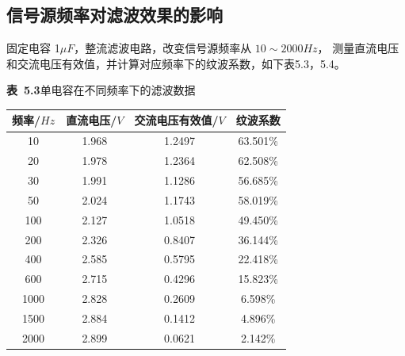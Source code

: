\documentclass{article}
\def\kong{\hspace*{2em}}
\begin{document}
    \subsection{信号源频率对滤波效果的影响}
        \kong 固定电容 1$\mu F$，整流滤波电路，改变信号源频率从 $10\sim2000Hz$，
        测量直流电压和交流电压有效值，并计算对应频率下的纹波系数，如下表5.3，5.4。\\[14pt]
        \begin{minipage}{1\linewidth}
            \centering
            \textbf{表\ 5.3}\quad 单电容在不同频率下的滤波数据  \\[4pt]
            \begin{tabular}{|c|c|c|c|}
            \hline
                    频率/$Hz$        & 直流电压/$V$   & 交流电压有效值/$V$  & 纹波系数  \\ \hline
                    10   & 1.968 & 1.2497 & 63.501\% \\ \hline
                    20   & 1.978 & 1.2364 & 62.508\% \\ \hline
                    30   & 1.991 & 1.1286 & 56.685\% \\ \hline
                    50   & 2.024 & 1.1743 & 58.019\% \\ \hline
                    100  & 2.127 & 1.0518 & 49.450\% \\ \hline
                    200  & 2.326 & 0.8407 & 36.144\% \\ \hline
                    400  & 2.585 & 0.5795 & 22.418\% \\ \hline
                    600  & 2.715 & 0.4296 & 15.823\% \\ \hline
                    1000 & 2.828 & 0.2609 & 6.598\% \\ \hline
                    1500 & 2.884 & 0.1412 & 4.896\% \\ \hline
                    2000 & 2.899 & 0.0621 & 2.142\% \\ \hline
            \end{tabular}\\[14pt]
        \end{minipage}\\[14pt]
\end{document}
